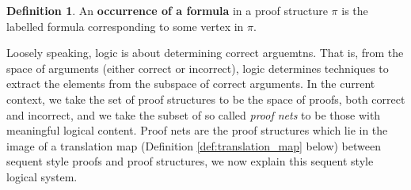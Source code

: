 \documentclass[12pt]{article}
\theoremstyle{plain}
\theoremstyle{definition}
\newtheorem{defn}[thm]{Definition} %
\begin{document}
	\begin{defn}\label{def:occurrences_labels}
		An \textbf{occurrence of a formula} in a proof structure $\pi$ is the labelled formula corresponding to some vertex in $\pi$.
	\end{defn}
	Loosely speaking, logic is about determining correct arguemtns. That is, from the space of arguments (either correct or incorrect), logic determines techniques to extract the elements from the subspace of correct arguments. In the current context, we take the set of proof structures to be the space of proofs, both correct and incorrect, and we take the subset of so called \emph{proof nets} to be those with meaningful logical content. Proof nets are the proof structures which lie in the image of a translation map (Definition \ref{def:translation_map} below) between sequent style proofs and proof structures, we now explain this sequent style logical system.
	
\end{document}
